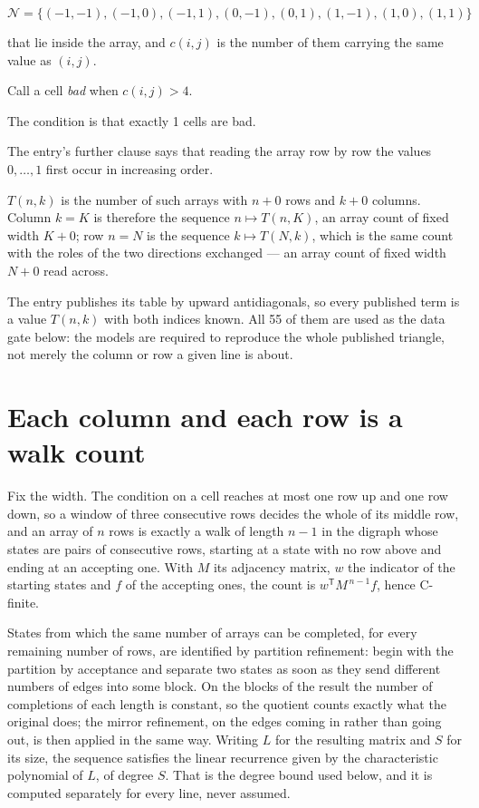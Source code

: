 \documentclass[11pt]{article}
\theoremstyle{definition}
\begin{document}
\[\mathcal{N} = \{(-1,-1), (-1,0), (-1,1), (0,-1), (0,1), (1,-1), (1,0), (1,1)\}\]

that lie inside the array, and $c(i,j)$ is the number of them carrying the same value as $(i,j)$.

Call a cell {\itshape bad} when $c(i,j) > 4$.

The condition is that exactly 1 cells are bad.

The entry's further clause says that reading the array row by row the values $0,\dots,1$ first occur in increasing order.

$T(n,k)$ is the number of such arrays with $n + 0$ rows and $k + 0$ columns. Column $k = K$ is therefore the sequence $n \mapsto T(n,K)$, an array count of fixed width $K + 0$; row $n = N$ is the sequence $k \mapsto T(N,k)$, which is the same count with the roles of the two directions exchanged --- an array count of fixed width $N + 0$ read across.

The entry publishes its table by upward antidiagonals, so every published term is a value $T(n,k)$ with both indices known. All 55 of them are used as the data gate below: the models are required to reproduce the whole published triangle, not merely the column or row a given line is about.

\section{Each column and each row is a walk count}

Fix the width. The condition on a cell reaches at most one row up and one row down, so a window of three consecutive rows decides the whole of its middle row, and an array of $n$ rows is exactly a walk of length $n-1$ in the digraph whose states are pairs of consecutive rows, starting at a state with no row above and ending at an accepting one. With $M$ its adjacency matrix, $w$ the indicator of the starting states and $f$ of the accepting ones, the count is $w^{\mathsf T}M^{\,n-1}f$, hence C-finite.

States from which the same number of arrays can be completed, for every remaining number of rows, are identified by partition refinement: begin with the partition by acceptance and separate two states as soon as they send different numbers of edges into some block. On the blocks of the result the number of completions of each length is constant, so the quotient counts exactly what the original does; the mirror refinement, on the edges coming in rather than going out, is then applied in the same way. Writing $L$ for the resulting matrix and $S$ for its size, the sequence satisfies the linear recurrence given by the characteristic polynomial of $L$, of degree $S$. That is the degree bound used below, and it is computed separately for every line, never assumed.
\end{document}
